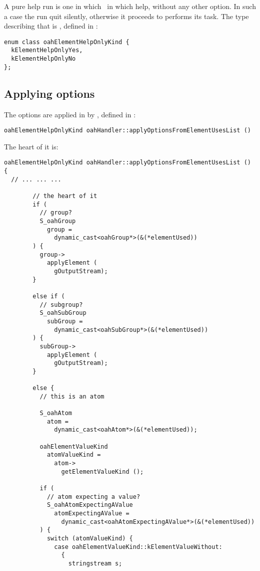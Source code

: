 {A pure help run is one in which \mf\ in which help, without any other option. In such a case the run quit silently, otherwise it proceeds to performs its task. The type describing that is , defined in :
\begin{lstlisting}[language=CPlusPlus]
enum class oahElementHelpOnlyKind {
  kElementHelpOnlyYes,
  kElementHelpOnlyNo
};
\end{lstlisting}


	\subsection{Applying options}

The options are applied in  by , defined in :
\begin{lstlisting}[language=CPlusPlus]
oahElementHelpOnlyKind oahHandler::applyOptionsFromElementUsesList ()
\end{lstlisting}

The heart of it is:
\begin{lstlisting}[language=CPlusPlus]
oahElementHelpOnlyKind oahHandler::applyOptionsFromElementUsesList ()
{
  // ... ... ...

        // the heart of it
        if (
          // group?
          S_oahGroup
            group =
              dynamic_cast<oahGroup*>(&(*elementUsed))
        ) {
          group->
            applyElement (
              gOutputStream);
        }

        else if (
          // subgroup?
          S_oahSubGroup
            subGroup =
              dynamic_cast<oahSubGroup*>(&(*elementUsed))
        ) {
          subGroup->
            applyElement (
              gOutputStream);
        }

        else {
          // this is an atom

          S_oahAtom
            atom =
              dynamic_cast<oahAtom*>(&(*elementUsed));

          oahElementValueKind
            atomValueKind =
              atom->
                getElementValueKind ();

          if (
            // atom expecting a value?
            S_oahAtomExpectingAValue
              atomExpectingAValue =
                dynamic_cast<oahAtomExpectingAValue*>(&(*elementUsed))
          ) {
            switch (atomValueKind) {
              case oahElementValueKind::kElementValueWithout:
                {
                  stringstream s;


\end{lstlisting}}
